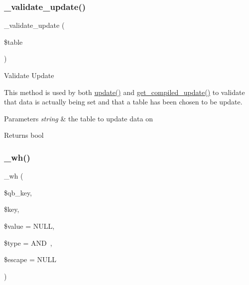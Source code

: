 \subsubsection{\texorpdfstring{\+\_\+validate\+\_\+update()}{\_validate\_update()}}
{\footnotesize\ttfamily \+\_\+validate\+\_\+update (\begin{DoxyParamCaption}\item[{}]{\$table }\end{DoxyParamCaption})\hspace{0.3cm}{\ttfamily [protected]}}

Validate Update

This method is used by both \mbox{\hyperlink{class_c_i___d_b__query__builder_a130a26da2dd4e4582ee18f42d71fe6e4}{update()}} and \mbox{\hyperlink{class_c_i___d_b__query__builder_a77fb150224714405067df7c300c317b0}{get\+\_\+compiled\+\_\+update()}} to validate that data is actually being set and that a table has been chosen to be update.


\begin{DoxyParams}{Parameters}
{\em string} & the table to update data on \\
\hline
\end{DoxyParams}
\begin{DoxyReturn}{Returns}
bool 
\end{DoxyReturn}
\mbox{\label{class_c_i___d_b__query__builder_a616af9ae6c40b3fe7074a8517207934f}} 
\subsubsection{\texorpdfstring{\+\_\+wh()}{\_wh()}}
{\footnotesize\ttfamily \+\_\+wh (\begin{DoxyParamCaption}\item[{}]{\$qb\+\_\+key,  }\item[{}]{\$key,  }\item[{}]{\$value = {\ttfamily NULL},  }\item[{}]{\$type = {\ttfamily \textquotesingle{}AND~\textquotesingle{}},  }\item[{}]{\$escape = {\ttfamily NULL} }\end{DoxyParamCaption})\hspace{0.3cm}{\ttfamily [protected]}}

